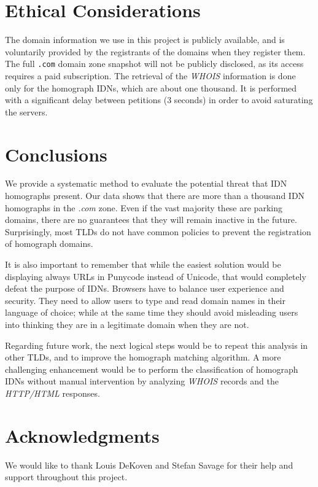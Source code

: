 \documentclass[letterpaper,twocolumn,10pt]{article}
\begin{document}
\section{Ethical Considerations}
The domain information we use in this project is publicly available, and is voluntarily provided by the registrants of the domains when they register them.
The full \texttt{.com} domain zone snapshot will not be publicly disclosed, as its access requires a paid subscription.
The retrieval of the \textit{WHOIS} information is done only for the homograph IDNs, which are about one thousand.
It is performed with a significant delay between petitions (3 seconds) in order to avoid saturating the servers.

\section{Conclusions}
We provide a systematic method to evaluate the potential threat that IDN homographs present.
Our data shows that there are more than a thousand IDN homographs in the \textit{.com} zone.
Even if the vast majority these are parking domains, there are no guarantees that they will remain inactive in the future.
Surprisingly, most TLDs do not have common policies to prevent the registration of homograph domains.

It is also important to remember that while the easiest solution would be displaying always URLs in Punycode instead of Unicode, that would completely defeat the purpose of IDNs.
Browsers have to balance user experience and security.
They need to allow users to type and read domain names in their language of choice; while at the same time they should avoid misleading users into thinking they are in a legitimate domain when they are not.

Regarding future work, the next logical steps would be to repeat this analysis in other TLDs, and to improve the homograph matching algorithm.
A more challenging enhancement would be to perform the classification of homograph IDNs without manual intervention by analyzing \textit{WHOIS} records and the \textit{HTTP/HTML} responses.

\section*{Acknowledgments}
We would like to thank Louis DeKoven and Stefan Savage for their help and support throughout this project.

{\footnotesize 
}

\clearpage

\theendnotes
\end{document}
